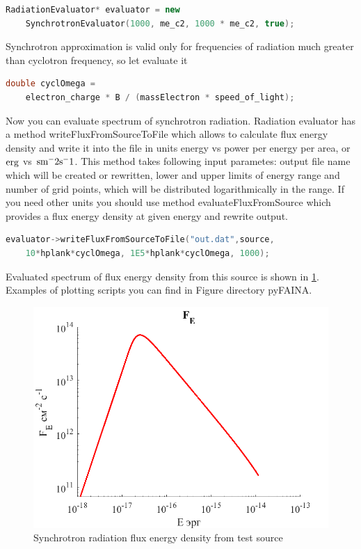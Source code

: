 \begin{lstlisting}[language=c++]
	RadiationEvaluator* evaluator = new 
	SynchrotronEvaluator(1000, me_c2, 1000 * me_c2, true);
\end{lstlisting}

Synchrotron approximation is valid only for frequencies of radiation much greater than cyclotron frequency, so let evaluate it

\begin{lstlisting}[language=c++]
	double cyclOmega = 
	electron_charge * B / (massElectron * speed_of_light);
\end{lstlisting}

Now you can evaluate spectrum of synchrotron radiation. Radiation evaluator has a method writeFluxFromSourceToFile which allows to calculate flux energy density and write it into the file in units energy vs power per energy per area, or $\rm erg$ vs $\rm sm^-2 s^-1$. This method takes following input parametes: output file name which will be created or rewritten, lower and upper limits of energy range and number of grid points, which will be distributed logarithmically in the range. If you need other units you should use method evaluateFluxFromSource which provides a flux energy density at given energy and rewrite output.

\begin{lstlisting}[language=c++]
	evaluator->writeFluxFromSourceToFile("out.dat",source, 
	10*hplank*cyclOmega, 1E5*hplank*cyclOmega, 1000);
\end{lstlisting}


Evaluated spectrum of flux energy density from this source is shown in \ref{example0}. Examples of plotting scripts you can find in Figure directory pyFAINA.
\begin{figure}
	\centering
	\includegraphics[width=12.5 cm]{./fig/example0.png} 
	\caption{Synchrotron radiation flux energy density from test source}
	\label{example0}
\end{figure}